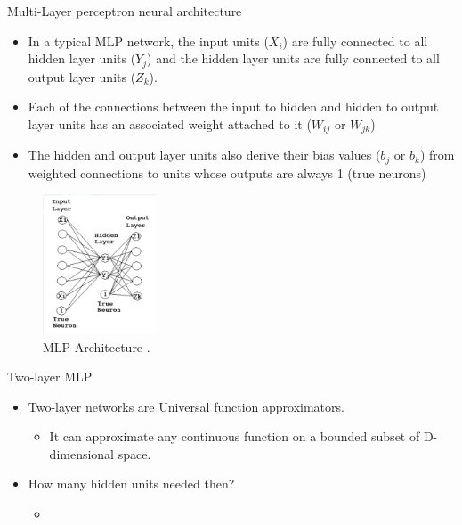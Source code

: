\begin{frame}{Multi-Layer perceptron neural architecture}
    \begin{itemize}
        \item In a typical MLP network, the input units ($X_i$) are fully
connected to all hidden layer units ($Y_j$) and the hidden layer
units are fully connected to all output layer units ($Z_k$).
        \item Each of the connections
between the input to hidden
and hidden to output layer
units has an associated weight
attached to it ($W_{ij}$ or $W_{jk}$)
        \item The hidden and output layer
units also derive their bias
values ($b_j$ or $b_k$) from
weighted connections to units
whose outputs are always 1
(true neurons)
    \end{itemize}
	\begin{figure}[H]
		\centering
		\includegraphics[width=0.3\textwidth]{Figs/MLP2.png}
		\caption{MLP Architecture \cite{Gonna Replace It/}.}
	\end{figure}
\end{frame}

\begin{frame}{Two-layer MLP}
    \begin{itemize}
        \item Two-layer networks are Universal function approximators.
        \begin{itemize}
            \item It can approximate any continuous function on a bounded subset of D-dimensional space.
        \end{itemize}
        \item How many hidden units needed then?
        \begin{itemize}
            \item 
        \end{itemize}
    \end{itemize}
\end{frame}


